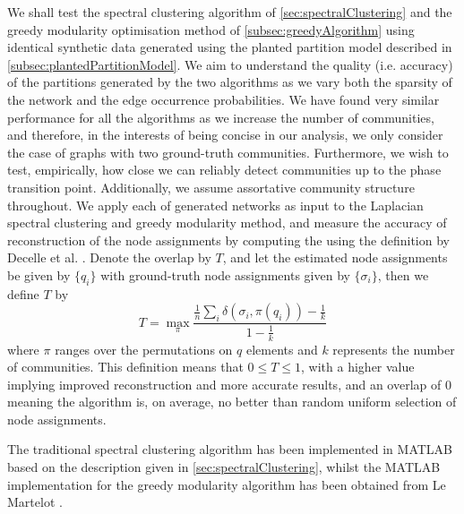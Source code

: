 We shall test the spectral clustering algorithm of \cref{sec:spectralClustering} and the greedy modularity optimisation method of \cref{subsec:greedyAlgorithm} using identical synthetic data generated using the planted partition model described in \cref{subsec:plantedPartitionModel}.
We aim to understand the quality (i.e. accuracy) of the partitions generated by the two algorithms as we vary both the sparsity of the network and the edge occurrence probabilities.
We have found very similar performance for all the algorithms as we increase the number of communities, and therefore, in the interests of being concise in our analysis, we only consider the case of graphs with two ground-truth communities.
Furthermore, we wish to test, empirically, how close we can reliably detect communities up to the phase transition point.
Additionally, we assume assortative community structure throughout.
We apply each of generated networks as input to the Laplacian spectral clustering and greedy modularity method, and measure the accuracy of reconstruction of the node assignments by computing the  using the definition by Decelle et al. \cite{DKM+11,DKM+13}.
Denote the overlap by $T$, and let the estimated node assignments be given by $\{q_{i}\}$ with ground-truth node assignments given by $\{\sigma_{i}\}$, then we define $T$ by
\begin{equation}
	\label{eq:overlap}
	T = \max_{\pi} \frac{\frac{1}{n} \sum_{i} \delta(\sigma_{i},\pi(q_{i})) - \frac{1}{k}}{1 - \frac{1}{k}}
\end{equation}
where $\pi$ ranges over the permutations on $q$ elements and $k$ represents the number of communities.
This definition means that $0 \le T \le 1$, with a higher value implying improved reconstruction and more accurate results, and an overlap of 0 meaning the algorithm is, on average, no better than random uniform selection of node assignments.

The traditional spectral clustering algorithm  has been implemented in MATLAB based on the description given in \cref{sec:spectralClustering}, whilst the MATLAB implementation for the greedy modularity algorithm has been obtained from Le Martelot \cite{ELM}.

